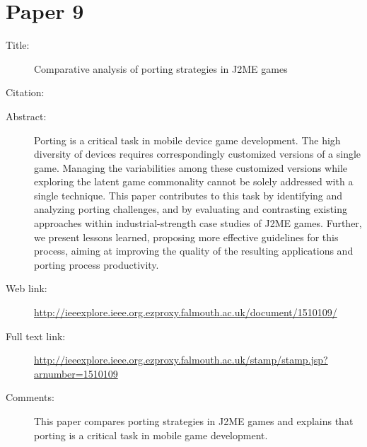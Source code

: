 \documentclass{scrartcl}
\begin{document}
\section*{Paper 9}
\begin{description}
\item[Title:] Comparative analysis of porting strategies in J2ME games
\item[Citation:] \cite{PortingJ2ME}
\item[Abstract:] Porting is a critical task in mobile device game development. The high diversity of devices requires correspondingly customized versions of a single game. Managing the variabilities among these customized versions while exploring the latent game commonality cannot be solely addressed with a single technique. This paper contributes to this task by identifying and analyzing porting challenges, and by evaluating and contrasting existing approaches within industrial-strength case studies of J2ME games. Further, we present lessons learned, proposing more effective guidelines for this process, aiming at improving the quality of the resulting applications and porting process productivity.
\item[Web link:] \url{http://ieeexplore.ieee.org.ezproxy.falmouth.ac.uk/document/1510109/}
\item[Full text link:] \url{http://ieeexplore.ieee.org.ezproxy.falmouth.ac.uk/stamp/stamp.jsp?arnumber=1510109}
\item[Comments:] This paper compares porting strategies in J2ME games and explains that porting is a critical task in mobile game development. 
\end{description}
\end{document}
